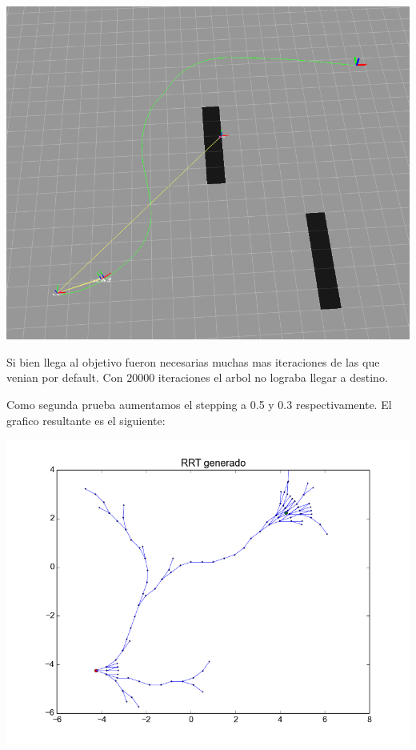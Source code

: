 \includegraphics[scale=0.5]{velocidad/stepping_Bajo_rviz1.png}

Si bien llega al objetivo fueron necesarias muchas mas iteraciones de las que venian por default. Con $20000$ iteraciones el arbol no lograba llegar a destino.

Como segunda prueba aumentamos el stepping a 0.5 y 0.3 respectivamente. El grafico resultante es el siguiente:

\includegraphics[scale=0.5]{velocidad/stepping_alto1.png}

